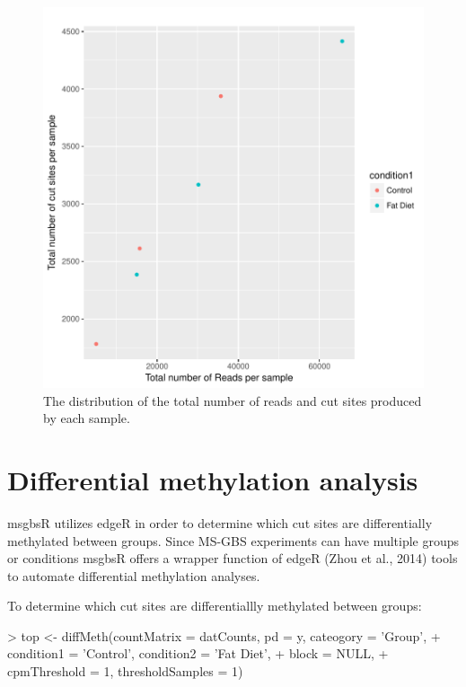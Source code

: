 \documentclass{article}
\begin{document}
\begin{figure}
\begin{center}
\includegraphics{msgbsR_Vignette-fig1}
\end{center}
\caption{The distribution of the total number of reads and cut sites produced by each sample.}
\label{fig:fig1}
\end{figure}

\clearpage


\section{Differential methylation analysis}

msgbsR utilizes edgeR in order to determine which cut sites are differentially methylated between groups. Since MS-GBS experiments can have multiple groups or conditions msgbsR offers a wrapper function of edgeR (Zhou et al., 2014) tools to automate differential methylation analyses.

To determine which cut sites are differentiallly methylated between groups:
\begin{Schunk}
\begin{Sinput}
> top <- diffMeth(countMatrix = datCounts, pd = y, cateogory = 'Group',
+                 condition1 = 'Control', condition2 = 'Fat Diet',
+                 block = NULL,
+                 cpmThreshold = 1, thresholdSamples = 1)
\end{Sinput}
\end{Schunk}
\end{document}
